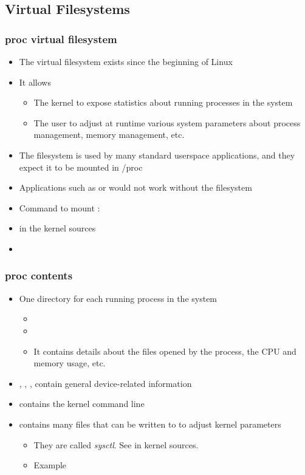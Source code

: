 \subsection{Virtual Filesystems}
\begin{frame}
  \frametitle{proc virtual filesystem}
  \begin{itemize}
  \item The  virtual filesystem exists since the beginning of
    Linux
  \item It allows
    \begin{itemize}
    \item The kernel to expose statistics about running processes in
      the system
    \item The user to adjust at runtime various system parameters
      about process management, memory management, etc.
    \end{itemize}
  \item The  filesystem is used by many standard userspace
    applications, and they expect it to be mounted in /proc
  \item Applications such as  or  would not work
    without the  filesystem
  \item Command to mount :\\
  \item {} in the kernel
    sources
  \item {}
  \end{itemize}
\end{frame}

\begin{frame}
  \frametitle{proc contents}
  \begin{itemize}
  \item One directory for each running process in the system
    \begin{itemize}
    \item {}
    \item {}
    \item It contains details about the files opened by the process,
      the CPU and memory usage, etc.
    \end{itemize}
  \item {}, ,
    ,  contain general
    device-related information
  \item {} contains the kernel command line
  \item {} contains many files that can be written to to
    adjust kernel parameters
    \begin{itemize}
    \item They are called {\em sysctl}. See
       in kernel sources.
    \item Example\\
    \end{itemize}
  \end{itemize}
\end{frame}

